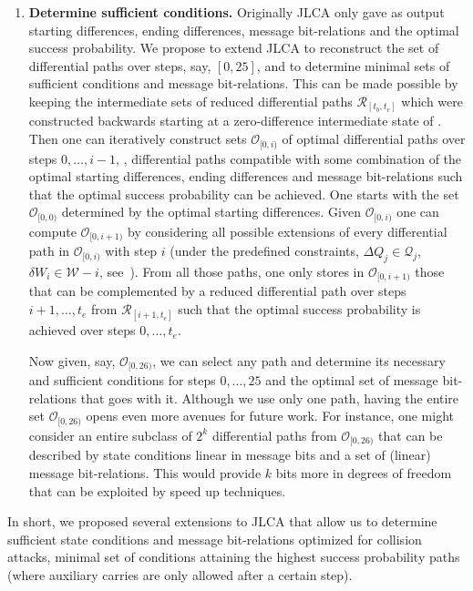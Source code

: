 \begin{enumerate}
\item \textbf{Determine sufficient conditions.} Originally JLCA only gave as output starting differences, ending differences, message bit-relations and the optimal success probability. 
We propose to extend JLCA to reconstruct the set of differential paths over steps, say, $[0,25]$, and to determine minimal sets of sufficient conditions and message bit-relations.
This can be made possible by keeping the intermediate sets of reduced differential paths $\mathcal{R}_{[t_b,t_e]}$ which were constructed backwards starting at a zero-difference intermediate state of \shaone.
Then one can iteratively construct sets $\mathcal{O}_{[0,i)}$ of optimal differential paths over steps $0,\ldots,i-1$, \ie, differential paths compatible with some combination of the optimal starting differences, ending differences and message bit-relations such that the optimal success probability can be achieved.
One starts with the set $\mathcal{O}_{[0,0)}$ determined by the optimal starting differences.
Given $\mathcal{O}_{[0,i)}$ one can compute $\mathcal{O}_{[0,i+1)}$ by considering all possible extensions of every differential path in $\mathcal{O}_{[0,i)}$ with step $i$ (under the predefined constraints, \ie $\Delta Q_j \in \mathcal{Q}_j$, $\delta W_i \in \mathcal{W}-i$, see~\cite{DBLP:conf/eurocrypt/Stevens13}). 
From all those paths, one only stores in $\mathcal{O}_{[0,i+1)}$ those that can be complemented by a reduced differential path over steps $i+1,\ldots,t_e$ from $\mathcal{R}_{[i+1,t_e]}$ such that the optimal success probability is achieved over steps $0,\ldots,t_e$.

Now given, say, $\mathcal{O}_{[0,26)}$, we can select any path and determine its necessary and sufficient conditions for steps $0,\ldots,25$ and the optimal set of message bit-relations that goes with it.
Although we use only one path, having the entire set $\mathcal{O}_{[0,26)}$ opens even more avenues for future work.
For instance, one might consider an entire subclass of $2^k$ differential paths from $\mathcal{O}_{[0,26)}$ that can be described by state conditions linear in message bits and a set of (linear) message bit-relations.
This would provide $k$ bits more in degrees of freedom that can be exploited by speed up techniques.
\end{enumerate}
In short, we proposed several extensions to JLCA that allow us to determine sufficient state conditions and message bit-relations optimized for collision attacks,
\ie minimal set of conditions attaining the highest success probability paths (where auxiliary carries are only allowed after a certain step).

